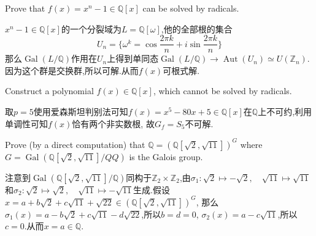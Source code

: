 \documentclass{exam-zh}
\newcommand{\ZZ}{{\mathbb{Z}}}
\newcommand{\QQ}{{\mathbb{Q}}}
\newcommand{\isom}{\simeq}
\DeclareMathOperator{\aut}{Aut}
\DeclareMathOperator{\gal}{Gal}
\begin{document}
\begin{question}
  Prove that $f(x)=x^n-1\in\QQ[x]$ can be solved by radicals.
\end{question}
\begin{solution}
  $x^n-1\in\QQ[x]$的一个分裂域为$L=\QQ[\omega]$,他的全部根的集合
  \[U_n=\{\omega^k=\cos\frac{2\pi k}{n}+i\sin\frac{2\pi k}{n}\}\]
  那么$\gal(L/\QQ)$作用在$U_n$上得到单同态$\gal(L/\QQ)\to \aut(U_n)\isom U(\ZZ_n)$.因为这个群是交换群,所以可解.从而$f(x)$可根式解.
\end{solution}
\begin{question}
  Construct a polynomial $f(x)\in \QQ[x]$, which cannot be solved by radicals.
\end{question}
\begin{solution}
取$p=5$使用爱森斯坦判别法可知$f(x)=x^5-80x+5\in\QQ[x]$在$\QQ$上不可约,利用单调性可知$f(x)$恰有两个非实数根, 故$G_f=S_5$不可解.
\end{solution}
\begin{question}
  Prove (by a direct computation) that $\QQ=(\QQ[\sqrt{2},\sqrt{11}])^G$ where $G=\gal(\QQ[\sqrt{2},\sqrt{11}]/QQ)$ is the Galois group.
\end{question}
\begin{solution}
  注意到$\gal(\QQ[\sqrt{2},\sqrt{11}]/\QQ)$同构于$\ZZ_2\times\ZZ_2$,由$\sigma_1:\sqrt{2}\mapsto-\sqrt{2},\quad \sqrt{11}\mapsto\sqrt{11}$和$\sigma_2:\sqrt{2}\mapsto \sqrt{2},\quad \sqrt{11}\mapsto -\sqrt{11}$生成.假设$x=a+b\sqrt{2}+c\sqrt{11}+\sqrt{22}\in (\QQ[\sqrt{2},\sqrt{11}])^G$, 那么$\sigma_1(x)=a-b\sqrt{2}+c\sqrt{11}-d\sqrt{22}$,所以$b=d=0$, $\sigma_2(x)=a-c\sqrt{11}$,所以$c=0$.从而$x=a\in\QQ$.
\end{solution}
\end{document}
